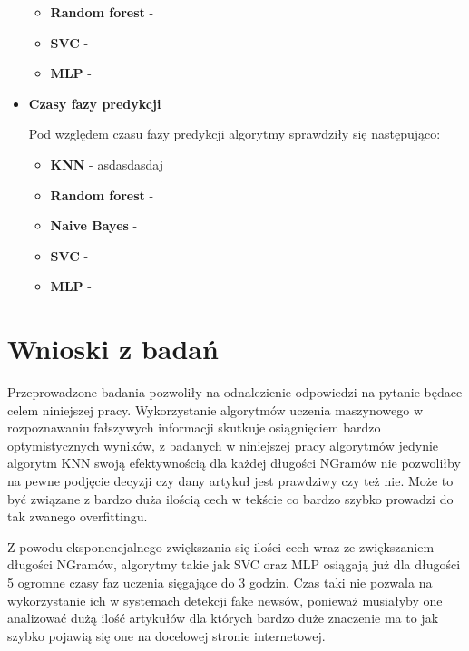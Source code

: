 \begin{itemize}
\begin{itemize}
        \item \textbf{Random forest} -
        
        \item \textbf{SVC} -
        
        \item \textbf{MLP} -
        
    \end{itemize}
    \item \textbf{Czasy fazy predykcji}
    
    Pod względem czasu fazy predykcji algorytmy sprawdziły się następująco:
    
    \begin{itemize}
        \item \textbf{KNN} -
        asdasdasdaj
        \item \textbf{Random forest} -
        
        \item \textbf{Naive Bayes} -
        
        \item \textbf{SVC} -
        
        \item \textbf{MLP} -
        
    \end{itemize}
\end{itemize}




\section{Wnioski z badań}
Przeprowadzone badania pozwoliły na odnalezienie odpowiedzi na pytanie 
będace celem niniejszej pracy. Wykorzystanie algorytmów uczenia maszynowego 
w rozpoznawaniu fałszywych informacji skutkuje osiągnięciem bardzo optymistycznych wyników,
z badanych w niniejszej pracy algorytmów jedynie algorytm KNN swoją efektywnością dla 
każdej długości NGramów nie pozwoliłby na pewne podjęcie decyzji czy dany artykuł jest prawdziwy czy też nie.
Może to być związane z bardzo duża ilością cech w tekście co bardzo szybko prowadzi do tak zwanego 
overfittingu. 

Z powodu eksponencjalnego zwiększania się ilości cech wraz ze zwiększaniem długości NGramów, 
algorytmy takie jak SVC oraz MLP osiągają już dla długości 5 ogromne czasy faz uczenia sięgające 
do 3 godzin. Czas taki nie pozwala na wykorzystanie ich w systemach detekcji fake newsów, ponieważ
musiałyby one analizować dużą ilość artykułów dla których bardzo duże znaczenie ma to jak 
szybko pojawią się one na docelowej stronie internetowej.

